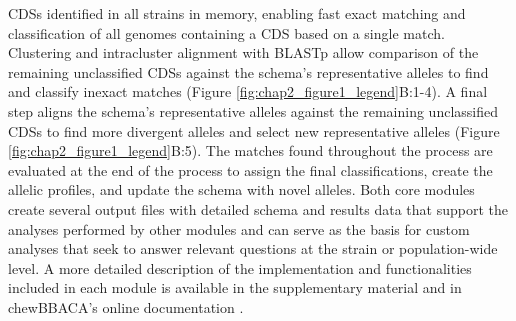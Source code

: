 \ac{CDSs} identified in all strains in memory, enabling fast exact matching and classification of all genomes containing a \ac{CDS} based on a single match. Clustering and intracluster alignment with \ac{BLASTp} allow comparison of the remaining unclassified \ac{CDSs} against the schema's representative alleles to find and classify inexact matches (Figure \ref{fig:chap2_figure1_legend}B:1-4). A final step aligns the schema's representative alleles against the remaining unclassified \ac{CDSs} to find more divergent alleles and select new representative alleles (Figure \ref{fig:chap2_figure1_legend}B:5). The matches found throughout the process are evaluated at the end of the process to assign the final classifications, create the allelic profiles, and update the schema with novel alleles. Both core modules create several output files with detailed schema and results data that support the analyses performed by other modules and can serve as the basis for custom analyses that seek to answer relevant questions at the strain or population-wide level.
A more detailed description of the implementation and functionalities included in each module is available in the supplementary material and in chewBBACA’s online documentation \citep{noauthor_chewbbaca_nodate}.

